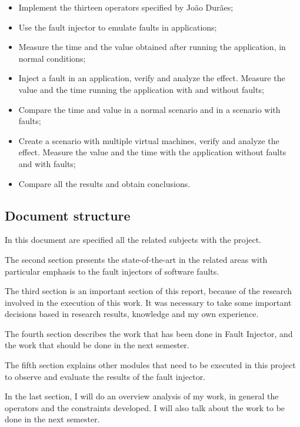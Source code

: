 \begin{itemize}
	\item Implement the thirteen operators specified by João Durães;
	\item Use the fault injector to emulate faults in applications;
	\item Measure the time and the value obtained after running the application, in normal conditions;
	\item Inject a fault in an application, verify and analyze the effect. Measure the value and the time running the application with and without faults;
	\item Compare the time and value in a normal scenario and in a scenario with faults;
	\item Create a scenario with multiple virtual machines, verify and analyze the effect. Measure the value and the time with the application without faults and with faults;
	\item Compare all the results and obtain conclusions.

\end{itemize}


\subsection{Document structure}

In this document are specified all the related subjects with the project.

The second section presents the state-of-the-art in the related areas with particular emphasis to the fault injectors of software faults.

The third section is an important section of this report, because of the research involved in the execution of this work. It was necessary to take some important decisions based in research results, knowledge and my own experience.

The fourth section describes the work that has been done in Fault Injector, and the work that should be done in the next semester.

The fifth section explains other modules that need to be executed in this project to observe and evaluate the results of the fault injector.

In the last section, I will do an overview analysis of my work, in general the operators and the constraints developed. I will also talk about the work to be done in the next semester.

